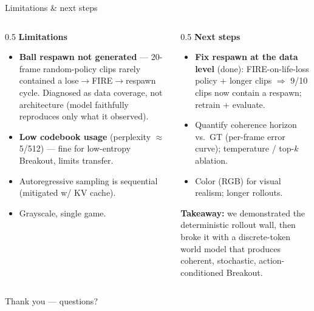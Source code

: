 \documentclass[aspectratio=169]{beamer}
\newcommand{\good}[1]{\textcolor{cGood}{#1}}
\begin{document}
\begin{frame}{Limitations \& next steps}
  \begin{columns}
    \begin{column}{0.5\textwidth}
      \textbf{Limitations}
      \begin{itemize}
        \item \textbf{Ball respawn not generated} — 20-frame random-policy clips
              rarely contained a lose$\to$FIRE$\to$respawn cycle.
              \good{Diagnosed as data coverage}, not architecture (model
              faithfully reproduces only what it observed).
        \item \textbf{Low codebook usage} (perplexity $\approx$5/512) — fine for
              low-entropy Breakout, limits transfer.
        \item Autoregressive sampling is sequential (mitigated w/ KV cache).
        \item Grayscale, single game.
      \end{itemize}
    \end{column}
    \begin{column}{0.5\textwidth}
      \textbf{Next steps}
      \begin{itemize}
        \item \textbf{Fix respawn at the data level} (done): FIRE-on-life-loss
              policy + longer clips $\Rightarrow$ \good{9/10 clips now contain a
              respawn}; retrain + evaluate.
        \item Quantify coherence horizon vs.\ GT (per-frame error curve);
              temperature / top-$k$ ablation.
        \item Color (RGB) for visual realism; longer rollouts.
      \end{itemize}

      \vspace{0.5em}
      \textbf{Takeaway:} we demonstrated the deterministic rollout wall, then
      \good{broke it} with a discrete-token world model that produces coherent,
      stochastic, action-conditioned Breakout.
    \end{column}
  \end{columns}
  \vspace{0.3em}
  \centering \small Thank you --- questions?
\end{frame}
\end{document}
